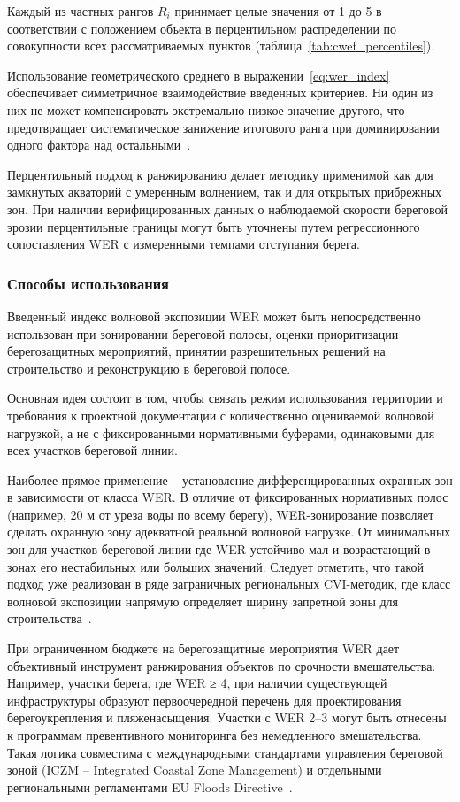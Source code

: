Каждый из частных рангов $R_i$ принимает целые значения от 1 до 5 в соответствии с положением объекта в перцентильном распределении по совокупности всех рассматриваемых пунктов (таблица~\ref{tab:cwef_percentiles}). 

Использование геометрического среднего в выражении~\eqref{eq:wer_index} обеспечивает симметричное взаимодействие введенных критериев.
Ни один из них не может компенсировать экстремально низкое значение другого, что предотвращает систематическое занижение итогового ранга при доминировании одного фактора над остальными~\cite{Guannel2022USVI_CVI}.

Перцентильный подход к ранжированию делает методику применимой как для замкнутых акваторий с умеренным волнением, так и для открытых прибрежных зон. 
При наличии верифицированных данных о наблюдаемой скорости береговой эрозии перцентильные границы могут быть уточнены путем регрессионного сопоставления WER с измеренными темпами отступания берега.

\subsubsection{Способы использования}
\label{sec:wer_usage}

Введенный индекс волновой экспозиции WER может быть непосредственно использован при зонировании береговой полосы, оценки приоритизации берегозащитных мероприятий, принятии разрешительных решений на строительство и реконструкцию в береговой полосе. 

Основная идея состоит в том, чтобы связать режим использования территории и требования к проектной документации с количественно оцениваемой волновой нагрузкой, а не с фиксированными нормативными буферами, одинаковыми для всех участков береговой линии.

Наиболее прямое применение -- установление дифференцированных охранных зон в зависимости от класса WER. 
В отличие от фиксированных нормативных полос (например, 20 м от уреза воды по всему берегу), WER-зонирование позволяет сделать охранную зону адекватной реальной волновой нагрузке.
От минимальных зон для участков береговой линии где WER устойчиво мал и возрастающий в зонах его нестабильных или больших значений. 
Следует отметить, что такой подход уже реализован в ряде заграничных региональных CVI-методик, где класс волновой экспозиции напрямую определяет ширину запретной зоны для строительства~\cite{Guannel2022USVI_CVI}.

При ограниченном бюджете на берегозащитные мероприятия WER дает объективный инструмент ранжирования объектов по срочности вмешательства. Например, участки берега, где WER ≥ 4, при наличии существующей инфраструктуры образуют первоочередной перечень для проектирования берегоукрепления и пляженасыщения. 
Участки с WER 2–3 могут быть отнесены к программам превентивного мониторинга без немедленного вмешательства. 
Такая логика совместима с международными стандартами управления береговой зоной (ICZM -- Integrated Coastal Zone Management) и отдельными региональными регламентами EU Floods Directive~\cite{Ghanavati2023_wave_surge_coastlines}.

